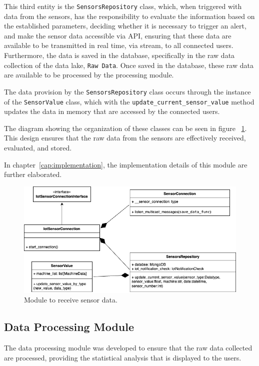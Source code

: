 This third entity is the \texttt{SensorsRepository} class, which, when triggered with data from the sensors, has the responsibility to evaluate the information based on the established parameters, deciding whether it is necessary to trigger an alert, and make the sensor data accessible via \gls{API}, ensuring that these data are available to be transmitted in real time, via stream, to all connected users. Furthermore, the data is saved in the database, specifically in the raw data collection of the data lake, \texttt{Raw Data}. Once saved in the database, these raw data are available to be processed by the processing module.

The data provision by the \texttt{SensorsRepository} class occurs through the instance of the \texttt{SensorValue} class, which with the \texttt{update\_current\_sensor\_value} method updates the data in memory that are accessed by the connected users.

The diagram showing the organization of these classes can be seen in figure ~\ref{fig:receiveData}. This design ensures that the raw data from the sensors are effectively received, evaluated, and stored.

In chapter~\ref{cap:implementation}, the implementation details of this module are further elaborated.


\begin{figure}[htbp]
	\centering
	\includegraphics[scale=0.45]{images/recebimento_dados.png}
	\caption{Module to receive sensor data.}
	\label{fig:receiveData}
\end{figure}


\subsection{Data Processing Module}\label{subsec:moduloProcessamento}
The data processing module was developed to ensure that the raw data collected are processed, providing the statistical analysis that is displayed to the users.

